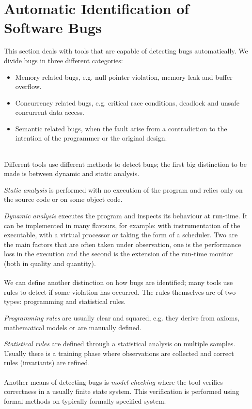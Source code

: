 
\section{Automatic Identification of Software Bugs}
This section deals with tools that are capable of detecting bugs automatically. We divide bugs in three different categories:
\begin{itemize}
    \item Memory related bugs, e.g. null pointer violation, memory leak and buffer overflow.
    \item Concurrency related bugs, e.g. critical race conditions, deadlock and unsafe concurrent data access.
    \item Semantic related bugs, when the fault arise from a contradiction to the intention of the programmer or the original design.
\end{itemize}
\\
Different tools use different methods to detect bugs; the first big distinction to be made is between dynamic and static analysis.

\emph{Static analysis} is performed with no execution of the program and relies only on the source code or on some object code. 

\emph{Dynamic analysis} executes the program and inspects its behaviour at run-time. It can be implemented in many flavours, for example: with instrumentation of the executable, with a virtual processor or taking the form of a scheduler. Two are the main factors that are often taken under observation, one is the performance loss in the execution and the second is the extension of the run-time monitor (both in quality and quantity).
\\
\\
We can define another distinction on how bugs are identified; many tools use rules to detect if some violation has occurred. The rules themselves are of two types: programming and statistical rules.

\emph{Programming rules} are usually clear and squared, e.g. they derive from axioms, mathematical models or are manually defined.

\emph{Statistical rules} are defined through a statistical analysis on multiple samples. Usually there is a training phase where observations are collected and correct rules (invariants) are refined.
\\
\\
Another means of detecting bugs is \emph{model checking} where the tool verifies correctness in a usually finite state system. This verification is performed using formal methods on typically formally specified system. 


